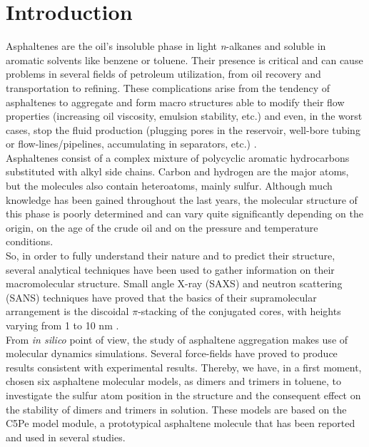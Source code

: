 \section{Introduction}


Asphaltenes are the oil's insoluble phase in light \textit{n}-alkanes and soluble in aromatic solvents like benzene or toluene\cite{mullins2011asphaltenes}. Their presence is critical and can cause problems in several fields of petroleum utilization, from oil recovery and transportation to refining.\cite{adams2014asphaltene} These complications arise from the tendency of asphaltenes to aggregate and form macro structures able to modify their flow properties (increasing oil viscosity, emulsion stability, etc.) and even, in the worst cases, stop the fluid production (plugging pores in the reservoir, well-bore tubing or flow-lines/pipelines, accumulating in separators, etc.) \cite{benamsili2013multi}.\\

Asphaltenes consist of a complex mixture of polycyclic aromatic hydrocarbons substituted with alkyl side chains. Carbon and hydrogen are the major atoms, but the molecules also contain heteroatoms, mainly sulfur.\cite{mullins2010modified} Although much knowledge has been gained throughout the last years, the molecular structure of this phase is poorly determined and can vary quite significantly depending on the origin, on the age of the crude oil and on the pressure and temperature conditions\cite{sabbah2011evidence}.\\

So, in order to fully understand their nature and to predict their structure, several analytical techniques have been used to gather information on their macromolecular structure. Small angle X-ray (SAXS) and neutron scattering (SANS) techniques have proved that the basics of their supramolecular arrangement is the discoidal $\pi$-stacking of the conjugated cores, with heights varying from 1 to 10 nm \cite{eyssautier2011insight,barre2009relation}.\\

From \textit{in silico} point of view, the study of asphaltene aggregation makes use of molecular dynamics simulations. Several force-fields have proved to produce results consistent with experimental results.\cite{sedghi2013effect,liu2015molecular,gao2014molecular} Thereby, we have, in a first moment, chosen six asphaltene molecular models, as dimers and trimers in toluene, to investigate the sulfur atom position in the structure and the consequent effect on the stability of dimers and trimers in solution. These models are based on the C5Pe model module, a prototypical asphaltene molecule that has been reported and used in several studies\cite{gao2014molecular,teklebrhan2014initial}.\\

